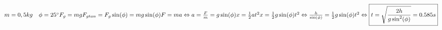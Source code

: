 \\
\begin{minipage}[t]{0.6\textwidth}
$
\\
m=0,5kg  \quad \phi = 25^\circ \\
F_g=mg\\
F_{gtan}=F_g \sin(\phi)=mg\sin(\phi)\\
\\
F=ma \Leftrightarrow a=\frac{F}{m}=g\sin(\phi)\\
\\
x=\frac{1}{2}a t^{2}\\
\\
x=\frac{1}{2}g \sin(\phi) t^2 \Leftrightarrow \frac{h}{\sin(\phi)}=\frac{1}{2}g\sin(\phi)t^2\\
\\
\Leftrightarrow \boxed{t=\sqrt{\frac{2h}{g\sin^2(\phi)}}=0.585s}\\
\\
$
%
\end{minipage}
